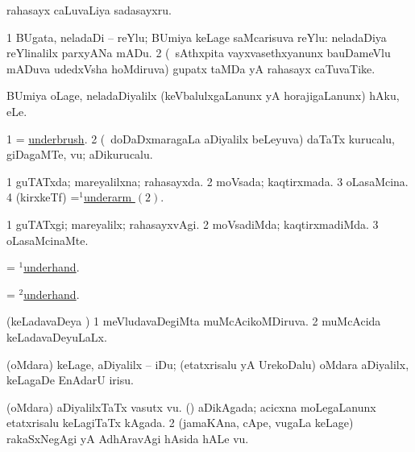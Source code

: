 \noindent
\gl{\pagu}
\expl{}
\bmng
  rahasayx caLuvaLiya sadasayxru. 
\emng
\eentry

\bentry
{} 
\gl{\nA}
\expl{}
\bmng
\bnum
\num{1} BUgata, neladaDi -- reYlu; BUmiya keLage saMcarisuva reYlu:  neladaDiya reYlinalilx parxyANa mADu. 
\num{2} (\kanmu\ sAthxpita vayxvasethxyanunx bauDameVlu mADuva udedxVsha hoMdiruva) gupatx taMDa yA rahasayx caTuvaTike. 
\enum
\emng
\eentry

\bentry
{} 
\gl{\sakirx}
\expl{}
\bmng
 BUmiya oLage, neladaDiyalilx (keVbalulxgaLanunx yA horajigaLanunx) hAku, eLe. 
\emng
\eentry

\bentry
{} 
\gl{\nA}
\expl{}
\bmng
\bnum
\num{1} = \hyperlink{underbrush}{underbrush}. 
\num{2} (\kanmu\ doDaDxmaragaLa aDiyalilx beLeyuva) daTaTx kurucalu, giDagaMTe, \mo vu; aDikurucalu. 
\enum
\emng
\eentry

\bentry
{} 
\gl{\gu}
\expl{}
\bmng
\bnum
\num{1} guTATxda; mareyalilxna; rahasayxda. 
\num{2} moVsada; kaqtirxmada. 
\num{3} oLasaMcina. 
\num{4} (kirxkeTf) =\hyperlink{underarm(1)2}{$^1$underarm \((2)\)}.  
\enum
\emng
\eentry

\bentry
{} 
\gl{\kirxvi}
\expl{}
\bmng
\bnum
\num{1} guTATxgi; mareyalilx; rahasayxvAgi. 
\num{2} moVsadiMda; kaqtirxmadiMda. 
\num{3} oLasaMcinaMte. 
\enum
\emng
\eentry

\bentry
{} 
\gl{\gu}
\expl{}
\bmng
 = \hyperlink{underhand(1)}{$^1$underhand}. 
\emng
\eentry

\bentry
{} 
\gl{\kirxvi}
\expl{}
\bmng
 = \hyperlink{underhand(2)}{$^2$underhand}. 
\emng
\eentry

\bentry
{} 
\gl{\gu}
\expl{}
\bmng
 (keLadavaDeya \vi) 
\bnum
\num{1} meVludavaDegiMta muMcAcikoMDiruva. 
\num{2} muMcAcida keLadavaDeyuLaLx. 
\enum
\emng
\eentry

\bentry
{} 
\gl{\sakirx}
\bmng
 (oMdara) keLage, aDiyalilx -- iDu; (etatxrisalu yA UrekoDalu) oMdara aDiyalilx, keLagaDe EnAdarU irisu. 
\emng
\eentry

\bentry
{} 
\gl{\nA}
\expl{}
\bmng
\bnum
{} 
\banum
{} (oMdara) aDiyalilxTaTx vasutx \mo vu. 
 (\kanmu) aDikAgada; acicxna moLegaLanunx etatxrisalu keLagiTaTx kAgada. 
\eanum
\numie
\num{2} (jamaKAna, cApe, \mo vugaLa keLage) rakaSxNegAgi yA AdhAravAgi hAsida hALe \mo vu. 
\enum
\emng
\eentry

